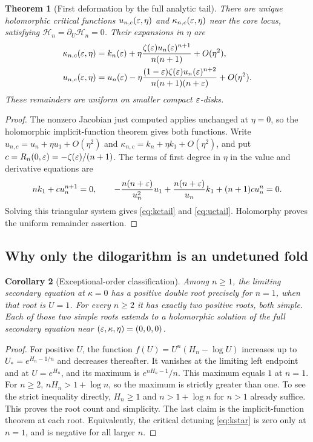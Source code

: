 \documentclass[11pt,a4paper]{article}
\numberwithin{equation}{section}
\newtheorem{theorem}{Theorem}[section]
\newtheorem{corollary}[theorem]{Corollary}
\theoremstyle{definition}\newtheorem{definition}[theorem]{Definition}
\theoremstyle{remark}\newtheorem{remark}[theorem]{Remark}
\newcommand{\HH}{\mathcal H}
\begin{document}
\begin{theorem}[First deformation by the full analytic tail]
\label{thm:tailcritical}
There are unique holomorphic critical functions
$u_{n,c}(\varepsilon,\eta)$ and $\kappa_{n,c}(\varepsilon,\eta)$ near the core
locus, satisfying $\HH_n=\partial_U\HH_n=0$. Their expansions in $\eta$
are
\begin{align}
 \kappa_{n,c}(\varepsilon,\eta)
 &=k_n(\varepsilon)+\eta\frac{\zeta(\varepsilon)u_n(\varepsilon)^{n+1}}{n(n+1)}
                                      +O(\eta^2),\label{eq:kctail}\\
 u_{n,c}(\varepsilon,\eta)
 &=u_n(\varepsilon)-\eta\frac{(1-\varepsilon)\zeta(\varepsilon)u_n(\varepsilon)^{n+2}}
                         {n(n+1)(n+\varepsilon)}+O(\eta^2).
                                      \label{eq:uctail}
\end{align}
These remainders are uniform on smaller compact $\varepsilon$-disks.
\end{theorem}
\begin{proof}
The nonzero Jacobian just computed applies unchanged at $\eta=0$, so the
holomorphic implicit-function theorem gives both functions. Write
$u_{n,c}=u_n+\eta u_1+O(\eta^2)$ and
$\kappa_{n,c}=k_n+\eta k_1+O(\eta^2)$, and put
$c=R_n(0,\varepsilon)=-\zeta(\varepsilon)/(n+1)$. The terms of first degree in
$\eta$ in the value and derivative equations are
\[
 nk_1+cu_n^{n+1}=0,
\qquad
 -\frac{n(n+\varepsilon)}{u_n^2}u_1
 +\frac{n(n+\varepsilon)}{u_n}k_1+(n+1)cu_n^n=0.
\]
Solving this triangular system gives \eqref{eq:kctail} and
\eqref{eq:uctail}. Holomorphy proves the uniform remainder assertion.
\end{proof}

\subsection{Why only the dilogarithm is an undetuned fold}
\begin{corollary}[Exceptional-order classification]\label{cor:exceptional}
Among $n\ge1$, the limiting secondary equation at $\kappa=0$ has a
positive double root precisely for $n=1$, when that root is $U=1$.
For every $n\ge2$ it has exactly two positive roots, both simple. Each
of those two simple roots extends to a holomorphic solution of the full
secondary equation near $(\varepsilon,\kappa,\eta)=(0,0,0)$.
\end{corollary}
\begin{proof}
For positive $U$, the function $f(U)=U^n(H_n-\log U)$ increases up to
$U_*=e^{H_n-1/n}$ and decreases thereafter. It vanishes at the limiting
left endpoint and at $U=e^{H_n}$, and its maximum is
$e^{nH_n-1}/n$. This maximum equals $1$ at $n=1$.
For $n\ge2$, $nH_n>1+\log n$, so the maximum is strictly greater than
one. To see the strict inequality directly, $H_n\ge1$ and
$n>1+\log n$ for $n>1$ already suffice. This proves the root count and
simplicity. The last claim is the implicit-function theorem at each root.
Equivalently, the critical detuning \eqref{eq:kstar} is zero only at
$n=1$, and is negative for all larger $n$.
\end{proof}
\end{document}
